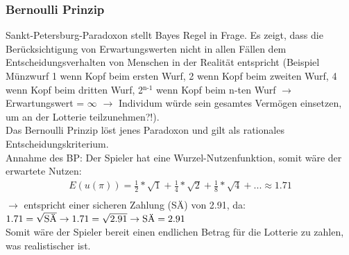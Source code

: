 \documentclass[11pt]{article}
\begin{document}
\subsubsection{Bernoulli Prinzip}
\label{sec:org3ec4c0c}
Sankt-Petersburg-Paradoxon stellt Bayes Regel in Frage. Es zeigt, dass die Berücksichtigung von Erwartungswerten nicht in allen Fällen dem Entscheidungsverhalten von Menschen in der Realität entspricht (Beispiel Münzwurf 1\texteuro{} wenn Kopf beim ersten Wurf, 2\texteuro{}  wenn Kopf beim zweiten Wurf, 4\texteuro{}  wenn Kopf beim dritten Wurf, 2\(^{\text{n-1}}\)\texteuro{} wenn Kopf beim n-ten Wurf \(\rightarrow\) Erwartungswert = \(\infty\) \(\rightarrow\) Individum würde sein gesamtes Vermögen einsetzen, um an der Lotterie teilzunehmen?!).\\
Das Bernoulli Prinzip löst jenes Paradoxon und gilt als rationales Entscheidungskriterium.\\
Annahme des BP: Der Spieler hat eine Wurzel-Nutzenfunktion, somit wäre der erwartete Nutzen:\\
\begin{equation*}
\begin{aligned}
E(u(\pi))=\frac{1}{2}*\sqrt{1} +\frac{1}{4}*\sqrt{2} +\frac{1}{8}*\sqrt{4} + ... \approx 1.71\\
\end{aligned}
\end{equation*}
\(\rightarrow\)  entspricht einer sicheren Zahlung (SÄ) von 2.91, da:\\
\(1.71 = \sqrt{\textnormal{SÄ}} \rightarrow 1.71 = \sqrt{2.91} \rightarrow \textnormal{SÄ} = 2.91\) \\
Somit wäre der Spieler bereit einen endlichen Betrag für die Lotterie zu zahlen, was realistischer ist.
\end{document}
